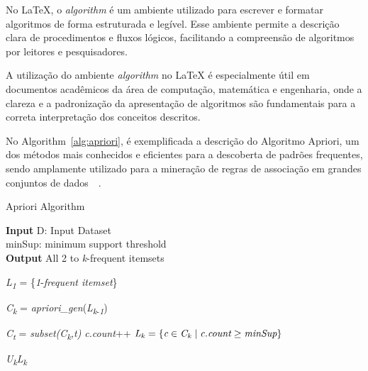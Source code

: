     No LaTeX, o \textit{algorithm} é um ambiente utilizado para escrever e formatar algoritmos de forma estruturada e legível. Esse ambiente permite a descrição clara de procedimentos e fluxos lógicos, facilitando a compreensão de algoritmos por leitores e pesquisadores.

    A utilização do ambiente \textit{algorithm} no LaTeX é especialmente útil em documentos acadêmicos da área de computação, matemática e engenharia, onde a clareza e a padronização da apresentação de algoritmos são fundamentais para a correta interpretação dos conceitos descritos. 

    No Algorithm~\ref{alg:apriori}, é exemplificada a descrição do Algoritmo Apriori, um dos métodos mais conhecidos e eficientes para a descoberta de padrões frequentes, sendo amplamente utilizado para a mineração de regras de associação em grandes conjuntos de dados~~\cite{Agrawal1994}.

    \begin{algorithm}
    \caption{Apriori Algorithm}\label{alg:apriori}
    \hspace*{\algorithmicindent} \textbf{Input} D: Input Dataset \\
    \hspace*{\algorithmicindent} \hspace{0.85cm} minSup: minimum support threshold \\    
    \hspace*{\algorithmicindent} \textbf{Output} All 2 to \textit{k}-frequent itemsets
    
    \begin{algorithmic}[1]

    \State \textit{L}\textsubscript{\textit{1}} = \{\textit{1}-\textit{frequent itemset}\}

        \State \textit{C}\textsubscript{\textit{k}} = \textit{apriori\_gen}(\textit{L}\textsubscript{\textit{k}-\textit{1}})

            \State \textit{C}\textsubscript{\textit{t}} = \textit{subset(\textit{C}\textsubscript{\textit{k}},t)}
                \State \textit{c.count}++
            \EndFor
        \EndFor
        \State $ \textit{L}\textsubscript{\textit{k}} = \{\textit{c}  \in \textit{C}\textsubscript{\textit{k}} \mid  \textit{\textit{c.count}} \geq \textit{minSup} \}$ 

    \EndFor        
        
    \Return  \textit{U}\textsubscript{\textit{k}}\textit{L}\textsubscript{\textit{k}}     
 
    \end{algorithmic}
    \end{algorithm}


